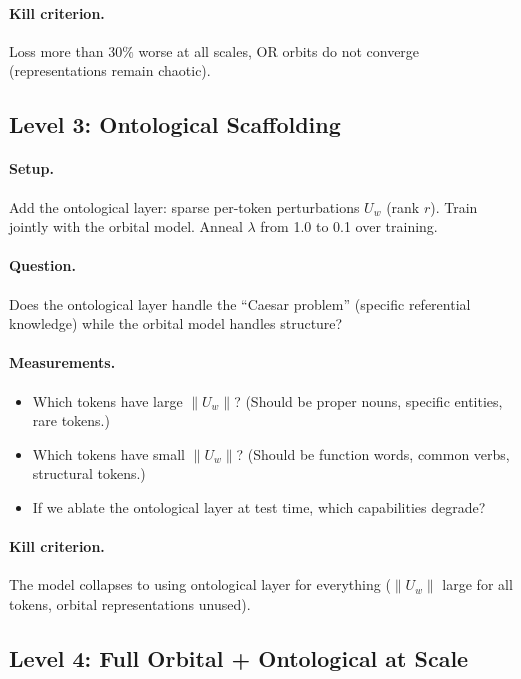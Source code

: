 \documentclass[11pt, a4paper]{article}
\theoremstyle{remark}
\begin{document}
\paragraph{Kill criterion.}
Loss more than $30\%$ worse at all scales, OR orbits do not converge (representations remain chaotic).

\subsection{Level 3: Ontological Scaffolding}

\paragraph{Setup.}
Add the ontological layer: sparse per-token perturbations $U_w$ (rank $r$).
Train jointly with the orbital model.
Anneal $\lambda$ from 1.0 to 0.1 over training.

\paragraph{Question.}
Does the ontological layer handle the ``Caesar problem'' (specific referential knowledge) while the orbital model handles structure?

\paragraph{Measurements.}
\begin{itemize}[nosep]
    \item Which tokens have large $\|U_w\|$? (Should be proper nouns, specific entities, rare tokens.)
    \item Which tokens have small $\|U_w\|$? (Should be function words, common verbs, structural tokens.)
    \item If we ablate the ontological layer at test time, which capabilities degrade?
\end{itemize}

\paragraph{Kill criterion.}
The model collapses to using ontological layer for everything ($\|U_w\|$ large for all tokens, orbital representations unused).

\subsection{Level 4: Full Orbital + Ontological at Scale}
\end{document}
